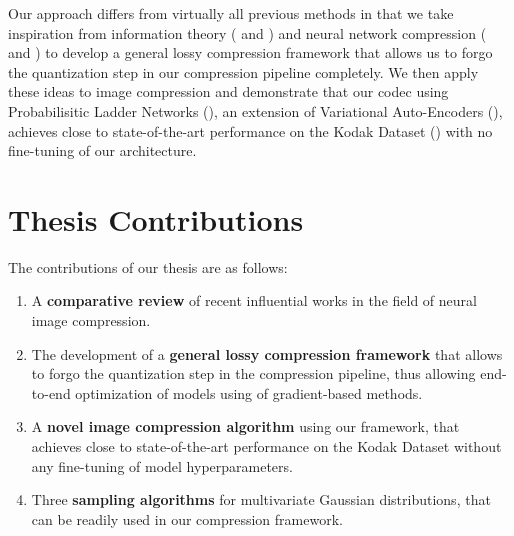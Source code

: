 \par
Our approach differs from virtually all previous methods in that we take
inspiration from information theory (\cite{rissanen1986stochastic} and
\cite{harsha2007communication}) and neural network compression
(\cite{hinton1993keeping} and \cite{havasi2018minimal}) to develop a general
lossy compression
framework that allows us to forgo the quantization step in our compression
pipeline completely. We then apply these ideas to image compression and
demonstrate that our codec using Probabilisitic Ladder Networks 
(\cite{sonderby2016train}), an extension of Variational Auto-Encoders
(\cite{kingma2013auto}), achieves close to state-of-the-art performance on the
Kodak Dataset (\cite{kodakdataset}) with no fine-tuning of our architecture.

\section{Thesis Contributions}
\par
The contributions of our thesis are as follows:
\begin{enumerate}
\item A \textbf{comparative review} of recent influential works in the field of
  neural image compression.

\item The development of a \textbf{general lossy compression
    framework} that allows to forgo the quantization step in the compression pipeline,
  thus allowing end-to-end optimization of models using of gradient-based methods.

\item A \textbf{novel image compression algorithm} using our framework, that 
  achieves close to state-of-the-art performance on the Kodak Dataset
  \cite{kodakdataset} without any fine-tuning of model hyperparameters.

\item Three \textbf{sampling algorithms} for multivariate Gaussian
  distributions, that can be readily used in our compression framework.
\end{enumerate}

